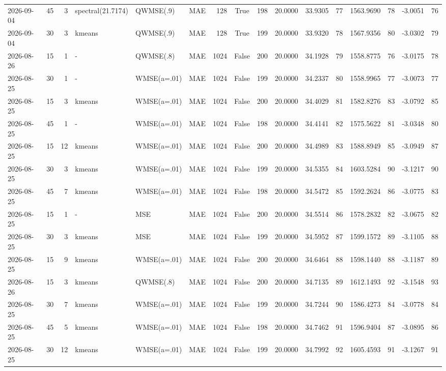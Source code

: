\documentclass[10pt]{article}
\begin{document}
\begin{landscape}
\begin{longtable}{@{}lrrlllrcrrrrrrrr@{}}
2026-09-04 & 45 & 3 & spectral(21.7174) & QWMSE(.9) & MAE & 128 & True & 198 & 20.0000 & 33.9305 & 77 & 1563.9690 & 78 & -3.0051 & 76 \\
2026-09-04 & 30 & 3 & kmeans & QWMSE(.9) & MAE & 128 & True & 199 & 20.0000 & 33.9320 & 78 & 1567.9356 & 80 & -3.0302 & 79 \\
2026-08-26 & 15 & 1 & - & QWMSE(.8) & MAE & 1024 & False & 200 & 20.0000 & 34.1928 & 79 & 1558.8775 & 76 & -3.0175 & 78 \\
2026-08-25 & 30 & 1 & - & WMSE(a=.01) & MAE & 1024 & False & 199 & 20.0000 & 34.2337 & 80 & 1558.9965 & 77 & -3.0073 & 77 \\
2026-08-25 & 15 & 3 & kmeans & WMSE(a=.01) & MAE & 1024 & False & 200 & 20.0000 & 34.4029 & 81 & 1582.8276 & 83 & -3.0792 & 85 \\
2026-08-25 & 45 & 1 & - & WMSE(a=.01) & MAE & 1024 & False & 198 & 20.0000 & 34.4141 & 82 & 1575.5622 & 81 & -3.0348 & 80 \\
2026-08-25 & 15 & 12 & kmeans & WMSE(a=.01) & MAE & 1024 & False & 200 & 20.0000 & 34.4989 & 83 & 1588.8949 & 85 & -3.0949 & 87 \\
2026-08-25 & 30 & 3 & kmeans & WMSE(a=.01) & MAE & 1024 & False & 199 & 20.0000 & 34.5355 & 84 & 1603.5284 & 90 & -3.1217 & 90 \\
2026-08-25 & 45 & 7 & kmeans & WMSE(a=.01) & MAE & 1024 & False & 198 & 20.0000 & 34.5472 & 85 & 1592.2624 & 86 & -3.0775 & 83 \\
2026-08-25 & 15 & 1 & - & MSE & MAE & 1024 & False & 200 & 20.0000 & 34.5514 & 86 & 1578.2832 & 82 & -3.0675 & 82 \\
2026-08-25 & 30 & 3 & kmeans & MSE & MAE & 1024 & False & 199 & 20.0000 & 34.5952 & 87 & 1599.1572 & 89 & -3.1105 & 88 \\
2026-08-25 & 15 & 9 & kmeans & WMSE(a=.01) & MAE & 1024 & False & 200 & 20.0000 & 34.6464 & 88 & 1598.1440 & 88 & -3.1187 & 89 \\
2026-08-26 & 15 & 3 & kmeans & QWMSE(.8) & MAE & 1024 & False & 200 & 20.0000 & 34.7135 & 89 & 1612.1493 & 92 & -3.1548 & 93 \\
2026-08-25 & 30 & 7 & kmeans & WMSE(a=.01) & MAE & 1024 & False & 199 & 20.0000 & 34.7244 & 90 & 1586.4273 & 84 & -3.0778 & 84 \\
2026-08-25 & 45 & 5 & kmeans & WMSE(a=.01) & MAE & 1024 & False & 198 & 20.0000 & 34.7462 & 91 & 1596.9404 & 87 & -3.0895 & 86 \\
2026-08-25 & 30 & 12 & kmeans & WMSE(a=.01) & MAE & 1024 & False & 199 & 20.0000 & 34.7992 & 92 & 1605.4593 & 91 & -3.1267 & 91 \\

\end{longtable}
\end{landscape}
\end{document}
